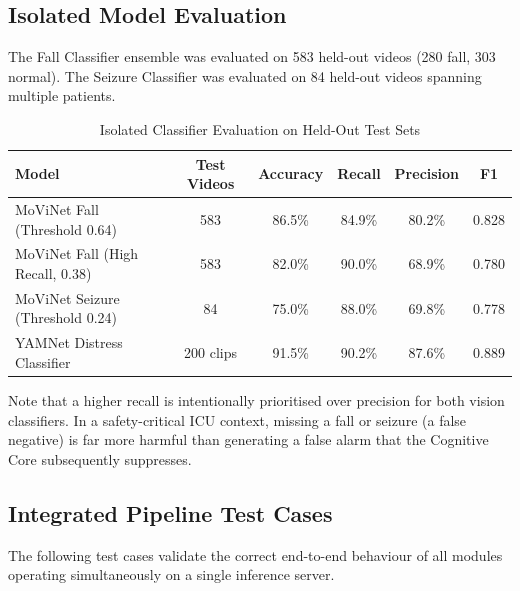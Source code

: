 \subsection{Isolated Model Evaluation}

The Fall Classifier ensemble was evaluated on 583 held-out videos (280 fall,
303 normal). The Seizure Classifier was evaluated on 84 held-out videos spanning
multiple patients.

\begin{table}[H]
    \centering
    \caption{Isolated Classifier Evaluation on Held-Out Test Sets}
    \label{tab:model_metrics}
    \renewcommand{\arraystretch}{1.3}
    \begin{tabular}{|l|c|c|c|c|c|}
    \hline
    \textbf{Model} & \textbf{Test Videos} & \textbf{Accuracy} & \textbf{Recall} & \textbf{Precision} & \textbf{F1} \\ \hline
    MoViNet Fall (Threshold 0.64) & 583 & 86.5\% & 84.9\% & 80.2\% & 0.828 \\ \hline
    MoViNet Fall (High Recall, 0.38) & 583 & 82.0\% & 90.0\% & 68.9\% & 0.780 \\ \hline
    MoViNet Seizure (Threshold 0.24) & 84 & 75.0\% & 88.0\% & 69.8\% & 0.778 \\ \hline
    YAMNet Distress Classifier & 200 clips & 91.5\% & 90.2\% & 87.6\% & 0.889 \\ \hline
    \end{tabular}
\end{table}

Note that a higher recall is intentionally prioritised over precision for both
vision classifiers. In a safety-critical ICU context, missing a fall or seizure
(a false negative) is far more harmful than generating a false alarm that the
Cognitive Core subsequently suppresses.

\subsection{Integrated Pipeline Test Cases}

The following test cases validate the correct end-to-end behaviour of all modules
operating simultaneously on a single inference server.


